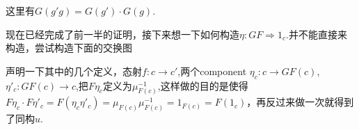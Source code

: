 \documentclass[UTF8,11pt,a4paper]{ctexart}
\newcommand{\To}{\Rightarrow}
\newcommand*{\xfunc}[4]{{#2}\colon{#3}{#1}{#4}}
\newcommand*{\func}[3]{\xfunc{\to}{#1}{#2}{#3}}
\newcommand*{\Func}[3]{\xfunc{\To}{#1}{#2}{#3}}
\begin{document}
\begin{center}
\end{center}

这里有$G(g'g)=G(g')\cdot G(g)$.

现在已经完成了前一半的证明，接下来想一下如何构造$\Func{\eta}{GF}{1_c}$.并不能直接来构造，尝试构造下面的交换图
\begin{center}
\end{center}
声明一下其中的几个定义，态射$\func{f}{c}{c'}$,两个component $\func{\eta_c}{c}{GF(c)}$, $\func{\eta'_c}{GF(c)}{c}$,把$F\eta_c$定义为$\mu^{-1}_{F(c)}$,这样做的目的是使得$F\eta_c  \cdot F\eta'_c=F(\eta_c\eta'_c) =\mu_{F(c)}\mu^{-1}_{F(c)}=1_{F(c)}=F(1_c)$，再反过来做一次就得到了同构$u$.
\end{document}
